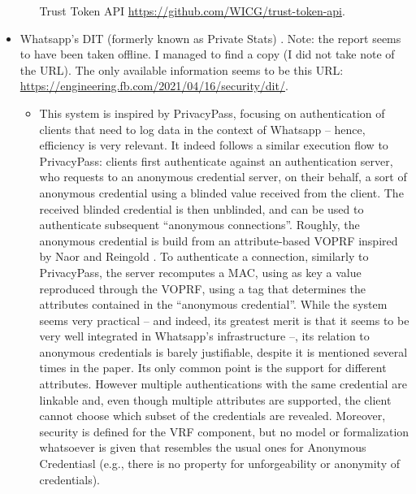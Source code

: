 \begin{itemize}
\begin{itemize}
    Trust Token API \url{https://github.com/WICG/trust-token-api}.
  \end{itemize}
\item Whatsapp's DIT (formerly known as Private Stats) \cite{hij+21}.
  Note: the report seems to have been taken offline. I managed to find a copy
  (I did not take note of the URL). The only available information seems
  to be this URL: \url{https://engineering.fb.com/2021/04/16/security/dit/}.
  \begin{itemize}
  \item This system is inspired by PrivacyPass, focusing on authentication of
    clients that need to log data in the context of Whatsapp -- hence,
    efficiency is very relevant. It indeed follows a similar execution flow to
    PrivacyPass: clients first authenticate against an authentication server,
    who requests to an anonymous credential server, on their behalf, a sort of
    anonymous credential using a blinded value received from the client. The
    received blinded credential is then unblinded, and can be used to authenticate
    subsequent ``anonymous connections''. Roughly, the anonymous credential is
    build from an attribute-based VOPRF inspired by Naor and Reingold
    \cite{nr04}. To authenticate a connection, similarly to PrivacyPass, the
    server recomputes a MAC, using as key a value reproduced through the VOPRF,
    using a tag that determines the attributes contained in the ``anonymous
    credential''. While the system seems very practical -- and indeed, its
    greatest merit is that it seems to be very well integrated in Whatsapp's
    infrastructure --, its relation to anonymous credentials is barely
    justifiable, despite it is mentioned several times in the paper. Its only
    common point is the support for different attributes. However multiple
    authentications with the same credential are linkable and, even though
    multiple attributes are supported, the client cannot choose which subset
    of the credentials are revealed. Moreover, security is defined for the
    VRF component, but no model or formalization whatsoever is given that
    resembles the usual ones for Anonymous Credentiasl (e.g., there is no
    property for unforgeability or anonymity of credentials).
  \end{itemize}
\end{itemize}


